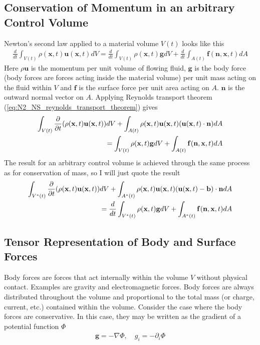 \documentclass[a4paper, 12pt]{article}
\numberwithin{equation}{subsubsection}
\begin{document}
\subsection{Conservation of Momentum in an arbitrary Control Volume}
Newton's second law applied to a material volume $V(t)$ looks like this
\begin{align}
	\frac{d}{dt} \int_{V(t)} \rho(\mathbf{x}, t) \mathbf{u}(\mathbf{x}, t) dV = \frac{d}{dt} \int_{V(t)} \rho(\mathbf{x}, t) \mathbf{g}dV + \frac{d}{dt} \int_{A(t)} \mathbf{f}(\mathbf{n}, \mathbf{x}, t) dA
\end{align}
Here $\rho \mathbf{u}$ is the momentum per unit volume of flowing fluid, $\mathbf{g}$ is the body force (body forces are forces acting inside the material volume) per unit mass acting on the fluid within $V$ and $\mathbf{f}$ is the surface force per unit area acting on $A$. $\mathbf{n}$ is the outward normal vector on $A$. Applying Reynolds transport theorem (\ref{eq:N2_NS_reynolds_transport_theorem}) gives
\begin{align}
	\int_{V(t)} \frac{\partial}{\partial t} (\rho(\mathbf{x}, t)\mathbf{u}(\mathbf{x}, t)) dV + \int_{A(t)} \rho(\mathbf{x}, t)\mathbf{u}(\mathbf{x}, t) (\mathbf{u}(\mathbf{x}, t) \cdot \mathbf{n}) dA \notag \\
	= \int_{V(t)} \rho(\mathbf{x}, t) \mathbf{g}dV + \int_{A(t)} \mathbf{f}(\mathbf{n}, \mathbf{x}, t) dA
\end{align}
The result for an arbitrary control volume is achieved through the same process as for conservation of mass, so I will just quote the result
\begin{align}
	\int_{V^*(t)} \frac{\partial}{\partial t} (\rho(\mathbf{x}, t)\mathbf{u}(\mathbf{x}, t)) dV + \int_{A^*(t)} \rho(\mathbf{x}, t)\mathbf{u}(\mathbf{x}, t) (\mathbf{u}(\mathbf{x}, t) - \mathbf{b}) \cdot \mathbf{n} dA \notag \\
	= \frac{d}{dt} \int_{V^*(t)} \rho(\mathbf{x}, t) \mathbf{g}dV + \int_{A^*(t)} \mathbf{f}(\mathbf{n}, \mathbf{x}, t) dA \label{eq:N2_NS_momentum_conservation}
\end{align}

\subsection{Tensor Representation of Body and Surface Forces}
Body forces are forces that act internally within the volume $V$ without physical contact. Examples are gravity and electromagnetic forces. Body forces are always distributed throughout the volume and proportional to the total mass (or charge, current, etc.) contained within the volume. Consider the case where the body forces are conservative. In this case, they may be written as the gradient of a potential function $\Phi$
\begin{align}
	\mathbf{g} = - \nabla \Phi, \quad g_i = - \partial_i \Phi
\end{align}
\end{document}
